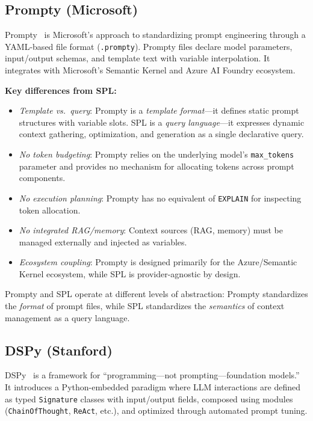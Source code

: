 \documentclass[11pt,a4paper]{article}
\begin{document}
\subsection{Prompty (Microsoft)}

Prompty~\citep{prompty2024} is Microsoft's approach to standardizing prompt engineering through a YAML-based file format (\texttt{.prompty}). Prompty files declare model parameters, input/output schemas, and template text with variable interpolation. It integrates with Microsoft's Semantic Kernel and Azure AI Foundry ecosystem.

\textbf{Key differences from SPL:}
\begin{itemize}[nosep]
  \item \emph{Template vs.\ query}: Prompty is a \emph{template format}---it defines static prompt structures with variable slots. SPL is a \emph{query language}---it expresses dynamic context gathering, optimization, and generation as a single declarative query.
  \item \emph{No token budgeting}: Prompty relies on the underlying model's \texttt{max\_tokens} parameter and provides no mechanism for allocating tokens across prompt components.
  \item \emph{No execution planning}: Prompty has no equivalent of \texttt{EXPLAIN} for inspecting token allocation.
  \item \emph{No integrated RAG/memory}: Context sources (RAG, memory) must be managed externally and injected as variables.
  \item \emph{Ecosystem coupling}: Prompty is designed primarily for the Azure/Semantic Kernel ecosystem, while SPL is provider-agnostic by design.
\end{itemize}

Prompty and SPL operate at different levels of abstraction: Prompty standardizes the \emph{format} of prompt files, while SPL standardizes the \emph{semantics} of context management as a query language.

\subsection{DSPy (Stanford)}

DSPy~\citep{khattab2023dspy} is a framework for ``programming---not prompting---foundation models.'' It introduces a Python-embedded paradigm where LLM interactions are defined as typed \texttt{Signature} classes with input/output fields, composed using modules (\texttt{ChainOfThought}, \texttt{ReAct}, etc.), and optimized through automated prompt tuning.
\end{document}
